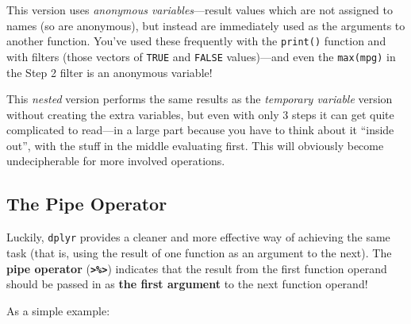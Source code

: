 \documentclass[]{book}
\newenvironment{Shaded}{\begin{snugshade}}{\end{snugshade}}
\newcommand{\KeywordTok}[1]{\textcolor[rgb]{0.13,0.29,0.53}{\textbf{#1}}}
\newcommand{\DecValTok}[1]{\textcolor[rgb]{0.00,0.00,0.81}{#1}}
\newcommand{\StringTok}[1]{\textcolor[rgb]{0.31,0.60,0.02}{#1}}
\newcommand{\CommentTok}[1]{\textcolor[rgb]{0.56,0.35,0.01}{\textit{#1}}}
\newcommand{\OperatorTok}[1]{\textcolor[rgb]{0.81,0.36,0.00}{\textbf{#1}}}
\newcommand{\NormalTok}[1]{#1}
\theoremstyle{definition}
\theoremstyle{definition}
\theoremstyle{remark}
\begin{document}
This version uses \emph{anonymous variables}---result values which are
not assigned to names (so are anonymous), but instead are immediately
used as the arguments to another function. You've used these frequently
with the \texttt{print()} function and with filters (those vectors of
\texttt{TRUE} and \texttt{FALSE} values)---and even the
\texttt{max(mpg)} in the Step 2 filter is an anonymous variable!

This \emph{nested} version performs the same results as the
\emph{temporary variable} version without creating the extra variables,
but even with only 3 steps it can get quite complicated to read---in a
large part because you have to think about it ``inside out'', with the
stuff in the middle evaluating first. This will obviously become
undecipherable for more involved operations.

\subsection{The Pipe Operator}\label{the-pipe-operator}

Luckily, \texttt{dplyr} provides a cleaner and more effective way of
achieving the same task (that is, using the result of one function as an
argument to the next). The \textbf{pipe operator}
(\textbf{\texttt{\textgreater{}\%\textgreater{}}}) indicates that the
result from the first function operand should be passed in as
\textbf{the first argument} to the next function operand!

As a simple example:

\begin{Shaded}
\end{Shaded}
\end{document}
